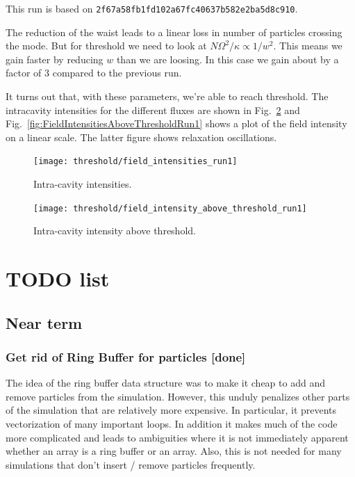 \documentclass[aps, superscriptaddress, groupedaddress, preprint]{revtex4}
\newcommand\gitrevision[1]{{\tt #1}}
\begin{document}
This run is based on
\gitrevision{2f67a58fb1fd102a67fc40637b582e2ba5d8c910}.

The reduction of the waist leads to a linear loss in number of
particles crossing the mode.  But for threshold we need to look
at $N\Omega^2/\kappa\propto 1/w^2$.  This means we gain faster by
reducing $w$ than we are loosing.  In this case we gain about by
a factor of 3 compared to the previous run.

It turns out that, with these parameters, we're able to reach
threshold.  The intracavity intensities for the different fluxes
are shown in Fig.~\ref{fig:FieldIntensitiesRun1} and
Fig.~\ref{fig:FieldIntensitiesAboveThresholdRun1} shows a plot of
the field intensity on a linear scale.  The latter figure shows
relaxation oscillations.

\begin{figure}
  \texttt{[image: threshold/field\_intensities\_run1]}
  \caption{Intra-cavity intensities.}
  \label{fig:FieldIntensitiesRun1}
\end{figure}

\begin{figure}
  \texttt{[image: threshold/field\_intensity\_above\_threshold\_run1]}
  \caption{Intra-cavity intensity above threshold.}
  \label{fig:FieldIntensitiesRun1}
\end{figure}


\section{TODO list}

\subsection{Near term}

\subsubsection{Get rid of Ring Buffer for particles {\bf [done]}}

The idea of the ring buffer data structure was to make it cheap
to add and remove particles from the simulation.  However, this
unduly penalizes other parts of the simulation that are
relatively more expensive.  In particular, it prevents
vectorization of many important loops.  In addition it makes much
of the code more complicated and leads to ambiguities where it is
not immediately apparent whether an array is a ring buffer or an
array.  Also, this is not needed for many simulations that don't
insert / remove particles frequently.
\end{document}
